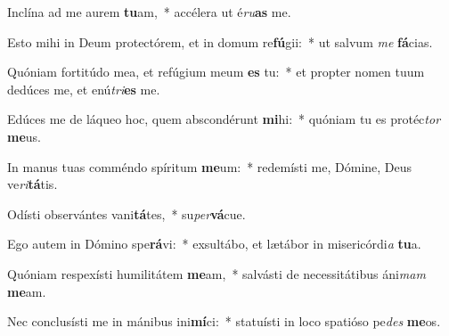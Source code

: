 \item Inclína ad me aurem \textbf{tu}am,~* accélera ut é\textit{ru}\textbf{as} me.
\item Esto mihi in Deum protectórem, et in domum re\textbf{fú}gii:~* ut salvum \textit{me} \textbf{fá}cias.
\item Quóniam fortitúdo mea, et refúgium meum \textbf{es} tu:~* et propter nomen tuum dedúces me, et enú\textit{tri}\textbf{es} me.
\item Edúces me de láqueo hoc, quem abscondérunt \textbf{mi}hi:~* quóniam tu es protéc\textit{tor} \textbf{me}us.
\item In manus tuas comméndo spíritum \textbf{me}um:~* redemísti me, Dómine, Deus ve\textit{ri}\textbf{tá}tis.
\item Odísti observántes vani\textbf{tá}tes,~* su\textit{per}\textbf{vá}cue.
\item Ego autem in Dómino spe\textbf{rá}vi:~* exsultábo, et lætábor in misericórdi\textit{a} \textbf{tu}a.
\item Quóniam respexísti humilitátem \textbf{me}am,~* salvásti de necessitátibus áni\textit{mam} \textbf{me}am.
\item Nec conclusísti me in mánibus ini\textbf{mí}ci:~* statuísti in loco spatióso pe\textit{des} \textbf{me}os.

